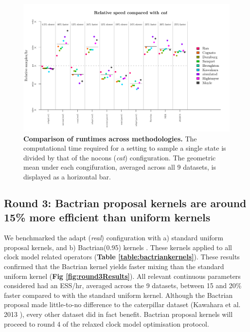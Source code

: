 \documentclass[10pt,letterpaper]{article}
\begin{document}
\begin{figure}[!h]
\includegraphics[width=\textwidth]{benchmarking/benchmarkingVM/ESS_timesettings.pdf}
\caption{\textbf{Comparison of runtimes across methodologies.} 
The computational time required for a setting to sample a single state is divided by that of the nocons (\textit{cat}) configuration.
The geometric mean under each congifuration, averaged across all 9 datasets, is displayed as a horizontal bar.}
\label{fig:round2Resultsb}
\end{figure}







\subsection*{Round 3: Bactrian proposal kernels are around 15\% more efficient than uniform kernels}


We benchmarked the adapt (\textit{real}) configuration with a) standard uniform proposal kernels, and b) Bactrian(0.95) kernels \cite{yang2013searching}.
These kernels applied to all clock model related operators (\textbf{Table \ref{table:bactriankernels}}).
These results confirmed that the Bactrian kernel yields faster mixing than the standard uniform kernel (\textbf{Fig \ref{fig:round3Results}}).
All relevant continuous parameters considered had an ESS/hr, averaged across the 9 datasets, between 15 and 20\% faster compared to with the standard uniform kernel.
Although the Bactrian proposal made little-to-no difference to the caterpillar dataset (Kawahara et al. 2013 \cite{Kawahara_2013}), every other dataset did in fact benefit.
Bactrian proposal kernels will proceed to round 4 of the relaxed clock model optimisation protocol. 
\end{document}
